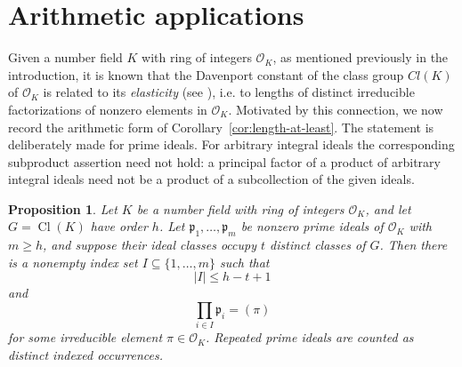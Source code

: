 \documentclass[12pt,reqno]{amsart}
\newtheorem{proposition}[theorem]{Proposition}
\theoremstyle{definition}
\theoremstyle{remark}
\newcommand{\Cl}{\operatorname{Cl}}
\newcommand{\cO}{\mathcal O}
\begin{document}
\section{Arithmetic applications}

Given a number field $K$ with ring of integers $\mathcal O_K$, as mentioned previously in the introduction, it is known that the Davenport constant of the class group $Cl(K)$ of $\mathcal O_K$ is related to its \textit{elasticity} (see \cite{Pollack2025}), i.e. to lengths of distinct irreducible factorizations of nonzero elements in $\mathcal O_K$. Motivated by this connection, we now record the arithmetic form of Corollary~\ref{cor:length-at-least}.  The statement is deliberately made for prime ideals.  For arbitrary integral ideals the corresponding subproduct assertion need not hold: a principal factor of a product of arbitrary integral ideals need not be a product of a subcollection of the given ideals.

\begin{proposition}\label{prop:prime-ideal-application}
Let $K$ be a number field with ring of integers $\cO_K$, and let $G=\Cl(K)$ have order $h$.  Let $\mathfrak p_1,\ldots,\mathfrak p_m$ be nonzero prime ideals of $\cO_K$ with $m\ge h$, and suppose their ideal classes occupy $t$ distinct classes of $G$.  Then there is a nonempty index set $I\subseteq\{1,\ldots,m\}$ such that
\[
 |I|\le h-t+1
\]
and
\[
 \prod_{i\in I}\mathfrak p_i=(\pi)
\]
for some irreducible element $\pi\in\cO_K$.  Repeated prime ideals are counted as distinct indexed occurrences.
\end{proposition}
\end{document}
